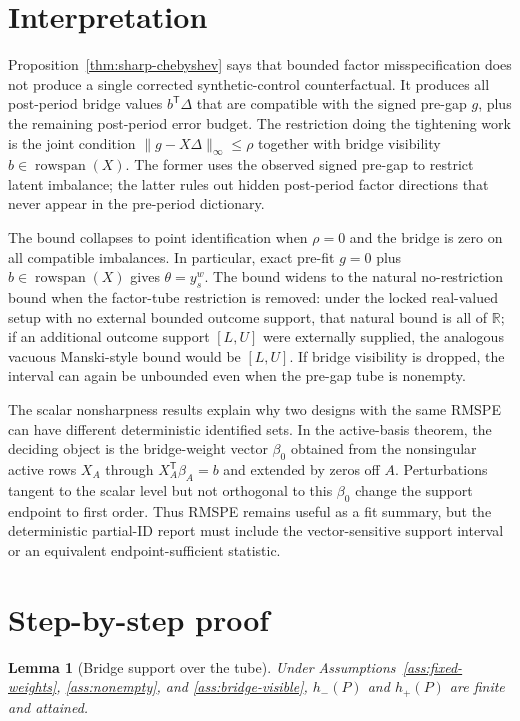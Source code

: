 \documentclass[11pt]{article}
\newcommand{\transpose}{\mathsf{T}}
\newcommand{\R}{\mathbb{R}}
\theoremstyle{definition}
\theoremstyle{plain}
\newtheorem{lemma}{Lemma}
\theoremstyle{remark}
\begin{document}
\section{Interpretation}
Proposition~\ref{thm:sharp-chebyshev} says that bounded factor misspecification
does not produce a single corrected synthetic-control counterfactual.  It
produces all post-period bridge values \(b^\transpose\Delta\) that are
compatible with the signed pre-gap \(g\), plus the remaining post-period error
budget.  The restriction doing the tightening work is the joint condition
\(\|g-X\Delta\|_\infty\le\rho\) together with bridge visibility
\(b\in\operatorname{rowspan}(X)\).  The former uses the observed signed
pre-gap to restrict latent imbalance; the latter rules out hidden post-period
factor directions that never appear in the pre-period dictionary.

The bound collapses to point identification when \(\rho=0\) and the bridge is
zero on all compatible imbalances.  In particular, exact pre-fit \(g=0\) plus
\(b\in\operatorname{rowspan}(X)\) gives \(\theta=y_s^w\).  The bound widens to
the natural no-restriction bound when the factor-tube restriction is removed:
under the locked real-valued setup with no external bounded outcome support,
that natural bound is all of \(\R\); if an additional outcome support
\([L,U]\) were externally supplied, the analogous vacuous Manski-style bound
would be \([L,U]\).  If bridge visibility is dropped, the interval can again be
unbounded even when the pre-gap tube is nonempty.

The scalar nonsharpness results explain why two designs with the same RMSPE can
have different deterministic identified sets.  In the active-basis theorem,
the deciding object is the bridge-weight vector \(\beta_0\) obtained from the
nonsingular active rows \(X_A\) through \(X_A^\transpose\beta_A=b\) and
extended by zeros off \(A\).  Perturbations tangent to the scalar level but not
orthogonal to this \(\beta_0\) change the support endpoint to first order.
Thus RMSPE remains useful as a fit summary, but the deterministic partial-ID
report must include the vector-sensitive support interval or an equivalent
endpoint-sufficient statistic.

\section{Step-by-step proof}
\begin{lemma}[Bridge support over the tube]\label{lem:bridge-support}
Under Assumptions~\ref{ass:fixed-weights}, \ref{ass:nonempty}, and
\ref{ass:bridge-visible}, \(h_-(P)\) and \(h_+(P)\) are finite and attained.
\end{lemma}
\end{document}
